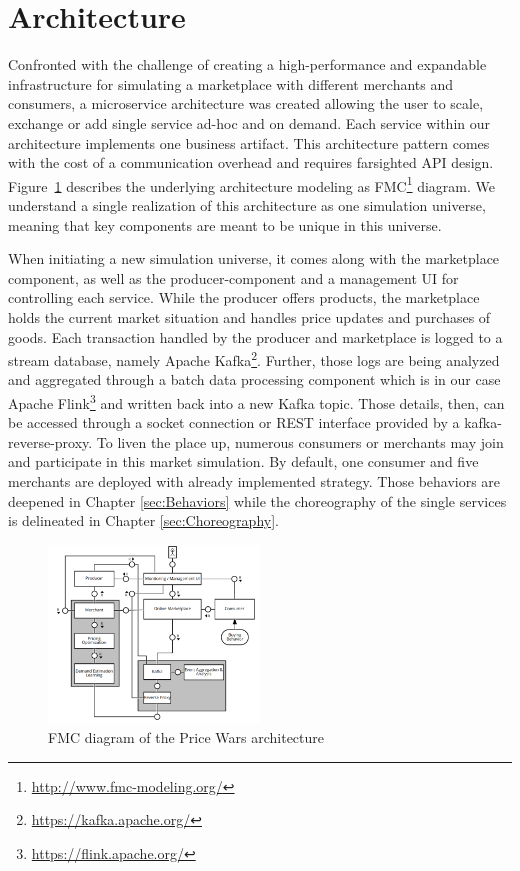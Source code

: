 \section{Architecture}
\label{sec:Architecture}
%
Confronted with the challenge of creating a high-performance and expandable infrastructure for simulating a marketplace with different merchants and consumers, a microservice architecture was created allowing the user to scale, exchange or add single service ad-hoc and on demand. Each service within our architecture implements one business artifact. This architecture pattern comes with the cost of a communication overhead and requires farsighted API design.\\

Figure~\ref{fig:fmc} describes the underlying architecture modeling as FMC\footnote{\url{http://www.fmc-modeling.org/}} diagram. We understand a single realization of this architecture as one simulation universe, meaning that key components are meant to be unique in this universe. 

When initiating a new simulation universe, it comes along with the marketplace component, as well as the producer-component and a management UI for controlling each service. While the producer offers products, the marketplace holds the current market situation and handles price updates and purchases of goods. Each transaction handled by the producer and marketplace is logged to a stream database, namely Apache Kafka\footnote{\url{https://kafka.apache.org/}}. Further, those logs are being analyzed and aggregated through a batch data processing component which is in our case Apache Flink\footnote{\url{https://flink.apache.org/}} and written back into a new Kafka topic. Those details, then, can be accessed through a socket connection or REST interface provided by a kafka-reverse-proxy. 
To liven the place up, numerous consumers or merchants may join and participate in this market simulation. By default, one consumer and five merchants are deployed with already implemented strategy. Those behaviors are deepened in Chapter \ref{sec:Behaviors} while the choreography of the single services is delineated in Chapter \ref{sec:Choreography}.

%
\begin{figure}[h]
    \centering
    \includegraphics[width=0.5\textwidth]{images/architecture_fmc.png}
    \caption{FMC diagram of the Price Wars architecture}
    \label{fig:fmc}
\end{figure}
%
